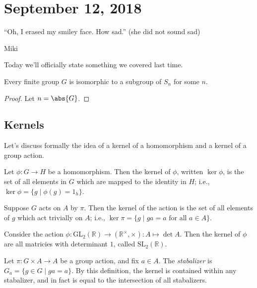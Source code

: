 \section{September 12, 2018}

\epigraph{``Oh, I erased my smiley face. How sad.'' (she did not sound sad)}{Miki}

Today we'll officially state something we covered last time.

\begin{theorem}
Every finite group $G$ is isomorphic to a subgroup of $S_n$ for some $n$.
\end{theorem}
\begin{proof}
Let $n = \abs{G}$.
\end{proof}

\subsection{Kernels}

Let's discuss formally the idea of a kernel of a homomorphism and a kernel of a group action.

\begin{definition}[Kernel]
Let $\phi : G \to H$ be a homomorphism. Then the kernel of $\phi$, written $\ker \phi$, is the set of all elements in $G$ which are mapped to the identity in $H$; i.e., $\ker \phi = \{g \mid \phi(g) = 1_h \}$.
\end{definition}

\begin{definition}
Suppose $G$ acts on $A$ by $\pi$. Then the kernel of the action is the set of all elements of $g$ which act trivially on $A$; i.e., $\ker \pi = \{g \mid ga = a \text{ for all $a \in A$}\}$.
\end{definition}

\begin{example}
Consider the action $\phi : \mathrm{GL}_2(\mathbb{R}) \to (\mathbb{R}^\times, \times) : A \mapsto \det A$. Then the kernel of $\phi$ are all matricies with determinant $1$, called $\mathrm{SL}_2(\mathbb{R})$.
\end{example}

\begin{definition}[Stabalizer]
Let $\pi : G \times A \to A$ be a group action, and fix $a \in A$. The \emph{stabalizer} is $G_a = \{g \in G \mid ga = a\}$. By this definition, the kernel is contained within any stabalizer, and in fact is equal to the intersection of all stabalizers.
\end{definition}

